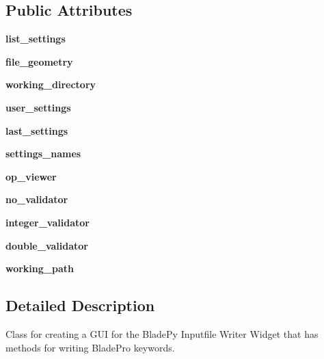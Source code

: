 \subsection*{Public Attributes}
\begin{DoxyCompactItemize}
\item 
\hypertarget{a00071_ad019b7f076cb8b8b6820b6577d2058b6}{}\label{a00071_ad019b7f076cb8b8b6820b6577d2058b6} 
{\bfseries list\+\_\+settings}
\item 
\hypertarget{a00071_a17d54af05f4344118b082c2384a88bec}{}\label{a00071_a17d54af05f4344118b082c2384a88bec} 
{\bfseries file\+\_\+geometry}
\item 
\hypertarget{a00071_a267e018648a6f03f2bcc0a5b7c944f38}{}\label{a00071_a267e018648a6f03f2bcc0a5b7c944f38} 
{\bfseries working\+\_\+directory}
\item 
\hypertarget{a00071_a4f8dfa192201c6c945621ff197680200}{}\label{a00071_a4f8dfa192201c6c945621ff197680200} 
{\bfseries user\+\_\+settings}
\item 
\hypertarget{a00071_aa8731441bd4fdf801f74947c28d44ebf}{}\label{a00071_aa8731441bd4fdf801f74947c28d44ebf} 
{\bfseries last\+\_\+settings}
\item 
\hypertarget{a00071_a3ce7139eaa5256714413efdb9f870eab}{}\label{a00071_a3ce7139eaa5256714413efdb9f870eab} 
{\bfseries settings\+\_\+names}
\item 
\hypertarget{a00071_af3daf3ca641b77de41d08750af03ef5e}{}\label{a00071_af3daf3ca641b77de41d08750af03ef5e} 
{\bfseries op\+\_\+viewer}
\item 
\hypertarget{a00071_aa6e2504eda6ac2ee99e37d4b5f862f57}{}\label{a00071_aa6e2504eda6ac2ee99e37d4b5f862f57} 
{\bfseries no\+\_\+validator}
\item 
\hypertarget{a00071_a33d2c6ecfa0800ef5eccfe0ce71475ee}{}\label{a00071_a33d2c6ecfa0800ef5eccfe0ce71475ee} 
{\bfseries integer\+\_\+validator}
\item 
\hypertarget{a00071_a007df19a104366a8bb63a8ed11e0e5e4}{}\label{a00071_a007df19a104366a8bb63a8ed11e0e5e4} 
{\bfseries double\+\_\+validator}
\item 
\hypertarget{a00071_a2e8a633f45ef3a17852bc95deae51588}{}\label{a00071_a2e8a633f45ef3a17852bc95deae51588} 
{\bfseries working\+\_\+path}
\end{DoxyCompactItemize}


\subsection{Detailed Description}
Class for creating a G\+UI for the Blade\+Py Inputfile Writer Widget that has methods for writing Blade\+Pro keywords. 

